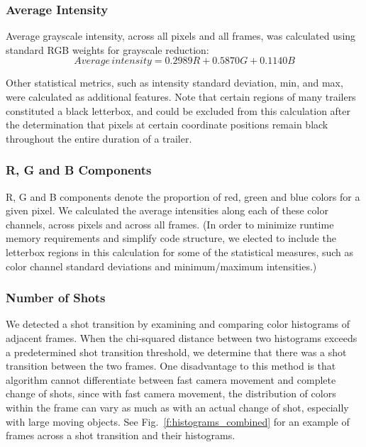 \documentclass[letterpaper, 10 pt, conference]{ieeeconf}  %
\begin{document}
\subsubsection{Average Intensity}
Average grayscale intensity, across all pixels and all frames, was calculated using standard RGB weights for grayscale reduction:
\begin{equation*}
Average\,intensity= 0.2989R+0.5870G+0.1140B
\end{equation*}

Other statistical metrics, such as intensity standard deviation, min, and max, were calculated as additional features. Note that certain regions of many trailers constituted a black letterbox, and could be excluded from this calculation after the determination that pixels at certain coordinate positions remain black throughout the entire duration of a trailer.

\subsubsection{R, G and B Components}

R, G and B components denote the proportion of red, green and blue colors for a given pixel. We calculated the average intensities along each of these color channels, across pixels and across all frames. (In order to minimize runtime memory requirements and simplify code structure, we elected to include the letterbox regions in this calculation for some of the statistical measures, such as color channel standard deviations and minimum/maximum intensities.)

\subsubsection{Number of Shots}
We detected a shot transition by examining and comparing color histograms of adjacent frames. When the chi-squared distance between two histograms exceeds a predetermined shot transition threshold, we determine that there was a shot transition between the two frames. One disadvantage to this method is that algorithm cannot differentiate between fast camera movement and complete change of shots, since with fast camera movement, the distribution of colors within the frame can vary as much as with an actual change of shot, especially with large moving objects. See Fig.~\ref{f:histograms_combined} for an example of frames across a shot transition and their histograms.
\end{document}
